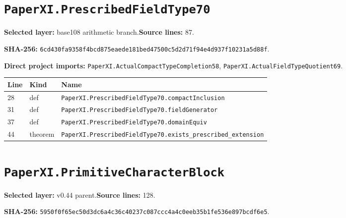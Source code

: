 \documentclass[10pt,oneside]{book}
\begin{document}
\section{\texorpdfstring{\nolinkurl{PaperXI.PrescribedFieldType70}}{PaperXI.PrescribedFieldType70}}\label{module:PaperXI.PrescribedFieldType70}

\textbf{Selected layer:} base108 arithmetic branch.\quad\textbf{Source lines:} 87.\par\textbf{SHA-256:} {\scriptsize\nolinkurl{6cd430fa9358f4bcd875eaede181bed47500c5d2d71f94e4d937f10231a5d88f}}.


\textbf{Direct project imports:} \nolinkurl{PaperXI.ActualCompactTypeCompletion58}, \nolinkurl{PaperXI.ActualFieldTypeQuotient69}.

\begin{longtable}{@{}p{}p{}p{}@{}}\toprule Line&Kind&Name\\\midrule\endhead

28&def&\nolinkurl{PaperXI.PrescribedFieldType70.compactInclusion}\\

31&def&\nolinkurl{PaperXI.PrescribedFieldType70.fieldGenerator}\\

37&def&\nolinkurl{PaperXI.PrescribedFieldType70.domainEquiv}\\

44&theorem&\nolinkurl{PaperXI.PrescribedFieldType70.exists_prescribed_extension}\\

\bottomrule\end{longtable}

\section{\texorpdfstring{\nolinkurl{PaperXI.PrimitiveCharacterBlock}}{PaperXI.PrimitiveCharacterBlock}}\label{module:PaperXI.PrimitiveCharacterBlock}

\textbf{Selected layer:} v0.44 parent.\quad\textbf{Source lines:} 128.\par\textbf{SHA-256:} {\scriptsize\nolinkurl{5950f0f65ec50d3dc6a4c36c40237c087ccc4a4c0eeb35b1fe536e897bcdf6e5}}.

\end{document}
